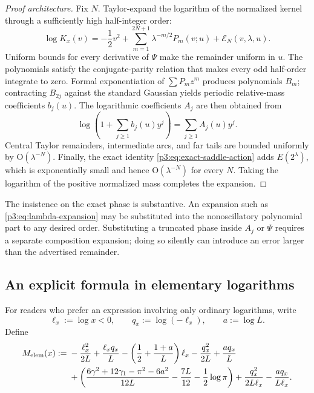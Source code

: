 \documentclass[11pt]{article}
\numberwithin{equation}{section}
\theoremstyle{definition}
\theoremstyle{remark}
\newcommand{\Oh}{\mathrm O}
\begin{document}
\begin{proof}[Proof architecture]
Fix $N$.  Taylor-expand the logarithm of the normalized kernel through a
sufficiently high half-integer order:
\begin{equation}\label{p3:eq:all-order-kernel-exp}
 \log K_x(v)=-\frac12v^2+
 \sum_{m=1}^{2N+1}\lambda^{-m/2}P_m(v;u)
 +\mathcal E_N(v,\lambda,u).
\end{equation}
Uniform bounds for every derivative of $\Psi$ make the remainder uniform in
$u$.  The polynomials satisfy the conjugate-parity relation that makes every
odd half-order integrate to zero.  Formal exponentiation of
$\sum P_mz^m$ produces polynomials $B_m$; contracting $B_{2j}$ against the
standard Gaussian yields periodic relative-mass coefficients $b_j(u)$.
The logarithmic coefficients $A_j$ are then obtained from
\begin{equation}\label{p3:eq:formal-log-coeff}
 \log\!\left(1+\sum_{j\ge1}b_j(u)y^j\right)
 =\sum_{j\ge1}A_j(u)y^j.
\end{equation}
Central Taylor remainders, intermediate arcs, and far tails are bounded
uniformly by $\Oh(\lambda^{-N})$.  Finally, the exact identity
\eqref{p3:eq:exact-saddle-action} adds $E(2^\lambda)$, which is exponentially
small and hence $\Oh(\lambda^{-N})$ for every $N$.  Taking the logarithm of
the positive normalized mass completes the expansion.
\end{proof}

The insistence on the exact phase is substantive.  An expansion such as
\eqref{p3:eq:lambda-expansion} may be substituted into the nonoscillatory
polynomial part to any desired order.  Substituting a truncated phase inside
$A_j$ or $\Psi$ requires a separate composition expansion; doing so silently
can introduce an error larger than the advertised remainder.

\subsection{An explicit formula in elementary logarithms}

For readers who prefer an expression involving only ordinary logarithms,
write
\begin{equation}\label{p3:eq:elementary-log-notation}
 \ell_x:=\log x<0,
 \qquad q_x:=\log(-\ell_x),
 \qquad a:=\log L.
\end{equation}
Define
\begin{align}
 M_{\mathrm{elem}}(x):={}&
 -\frac{\ell_x^2}{2L}+\frac{\ell_xq_x}{L}
 -\left(\frac12+\frac{1+a}{L}\right)\ell_x
 -\frac{q_x^2}{2L}+\frac{a q_x}{L}
 \notag\\
 &+\left(
 \frac{6\gamma^2+12\gamma_1-\pi^2-6a^2}{12L}
 -\frac{7L}{12}-\frac12\log\pi\right)
 +\frac{q_x^2}{2L\ell_x}-\frac{a q_x}{L\ell_x}.
 \label{p3:eq:M-elementary}
\end{align}
\end{document}
